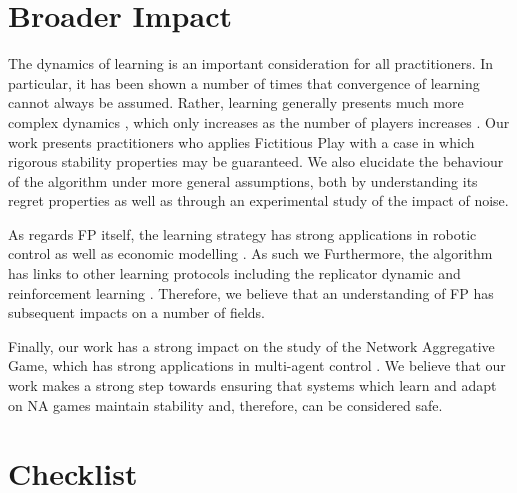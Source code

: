 \documentclass{article}
\theoremstyle{definition}
\begin{document}
\section*{Broader Impact}

The dynamics of learning is an important consideration for all practitioners. In particular, it has
been shown a number of times \cite{Mertikopoulos2018} that convergence of learning cannot always be
assumed. Rather, learning generally presents much more complex dynamics \cite{Galla2013}, which
only increases as the number of players increases \cite{Sanders2018}. Our work presents practitioners
who applies Fictitious Play with a case in which rigorous stability properties may be guaranteed.
We also elucidate the behaviour of the algorithm under more general assumptions, both by
understanding its regret properties as well as through an experimental study of the impact of noise.

As regards FP  itself, the learning strategy has strong applications in robotic control
\cite{Smyrnakis2016, Hernandez2013, Sharma2015} as well as economic modelling \cite{vonNeumann1944}. As such we
Furthermore, the algorithm has links to other learning protocols including the replicator dynamic
\cite{Benaim2006} and reinforcement learning \cite{Leslie2006}. Therefore, we believe that an
understanding of FP has subsequent impacts on a number of fields.

Finally, our work has a strong impact on the study of the Network Aggregative Game, which has strong
applications in multi-agent control \cite{Bianchi2019, DePersis2020}. We 
believe that our work makes a strong step towards ensuring that systems which learn and adapt on
NA games maintain stability and, therefore, can be considered safe.





\section*{Checklist}
\end{document}

